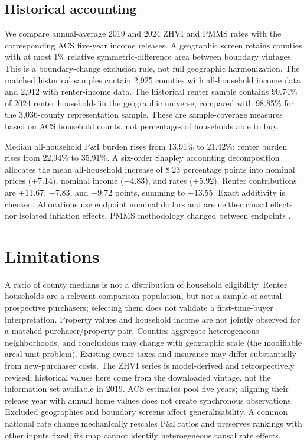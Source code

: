 \documentclass[conference,letterpaper]{IEEEtran}
\begin{document}
\subsection{Historical accounting}
We compare annual-average 2019 and 2024 ZHVI and PMMS rates with the corresponding ACS five-year income releases. A geographic screen retains counties with at most 1\% relative symmetric-difference area between boundary vintages. This is a boundary-change exclusion rule, not full geographic harmonization. The matched historical samples contain 2,925 counties with all-household income data and 2,912 with renter-income data. The historical renter sample contains 90.74\% of 2024 renter households in the geographic universe, compared with 98.85\% for the 3,036-county representation sample. These are sample-coverage measures based on ACS household counts, not percentages of households able to buy.

Median all-household P\&I burden rises from 13.91\% to 21.42\%; renter burden rises from 22.94\% to 35.91\%. A six-order Shapley accounting decomposition allocates the mean all-household increase of 8.23 percentage points into nominal prices (+7.14), nominal income ($-4.83$), and rates (+5.92). Renter contributions are +11.67, $-7.83$, and +9.72 points, summing to +13.55. Exact additivity is checked. Allocations use endpoint nominal dollars and are neither causal effects nor isolated inflation effects. PMMS methodology changed between endpoints \cite{pmmsmethod}.

\section{Limitations}
A ratio of county medians is not a distribution of household eligibility. Renter households are a relevant comparison population, but not a sample of actual prospective purchasers; selecting them does not validate a first-time-buyer interpretation. Property values and household income are not jointly observed for a matched purchaser/property pair. Counties aggregate heterogeneous neighborhoods, and conclusions may change with geographic scale (the modifiable areal unit problem). Existing-owner taxes and insurance may differ substantially from new-purchaser costs. The ZHVI series is model-derived and retrospectively revised; historical values here come from the downloaded vintage, not the information set available in 2019. ACS estimates pool five years; aligning their release year with annual home values does not create synchronous observations. Excluded geographies and boundary screens affect generalizability. A common national rate change mechanically rescales P\&I ratios and preserves rankings with other inputs fixed; its map cannot identify heterogeneous causal rate effects.
\end{document}
